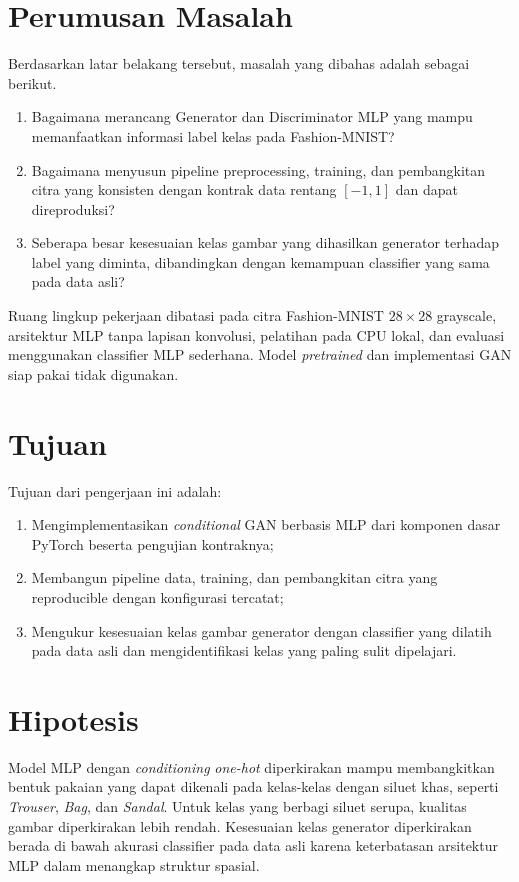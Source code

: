 \section{Perumusan Masalah}

Berdasarkan latar belakang tersebut, masalah yang dibahas adalah sebagai berikut.
\begin{enumerate}
    \item Bagaimana merancang Generator dan Discriminator MLP yang mampu memanfaatkan informasi label kelas pada Fashion-MNIST?
    \item Bagaimana menyusun pipeline preprocessing, training, dan pembangkitan citra yang konsisten dengan kontrak data rentang $[-1,1]$ dan dapat direproduksi?
    \item Seberapa besar kesesuaian kelas gambar yang dihasilkan generator terhadap label yang diminta, dibandingkan dengan kemampuan classifier yang sama pada data asli?
\end{enumerate}

Ruang lingkup pekerjaan dibatasi pada citra Fashion-MNIST $28\times28$ grayscale, arsitektur MLP tanpa lapisan konvolusi, pelatihan pada CPU lokal, dan evaluasi menggunakan classifier MLP sederhana. Model \textit{pretrained} dan implementasi GAN siap pakai tidak digunakan.

\section{Tujuan}

Tujuan dari pengerjaan ini adalah:
\begin{enumerate}
    \item Mengimplementasikan \textit{conditional} GAN berbasis MLP dari komponen dasar PyTorch beserta pengujian kontraknya;
    \item Membangun pipeline data, training, dan pembangkitan citra yang reproducible dengan konfigurasi tercatat;
    \item Mengukur kesesuaian kelas gambar generator dengan classifier yang dilatih pada data asli dan mengidentifikasi kelas yang paling sulit dipelajari.
\end{enumerate}

\section{Hipotesis}

Model MLP dengan \textit{conditioning} \textit{one-hot} diperkirakan mampu membangkitkan bentuk pakaian yang dapat dikenali pada kelas-kelas dengan siluet khas, seperti \textit{Trouser}, \textit{Bag}, dan \textit{Sandal}. Untuk kelas yang berbagi siluet serupa, kualitas gambar diperkirakan lebih rendah. Kesesuaian kelas generator diperkirakan berada di bawah akurasi classifier pada data asli karena keterbatasan arsitektur MLP dalam menangkap struktur spasial.

